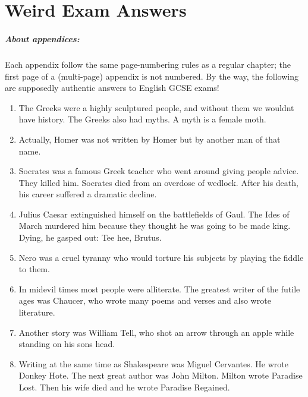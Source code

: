 \chapter{Weird Exam Answers}	%

\paragraph{About appendices:}
	Each appendix follow the same page-numbering rules
	as a regular chapter; the first page of a
	(multi-page) appendix is not numbered.
	By the way, the following are supposedly
	authentic answers to English GCSE exams!


\begin{enumerate}

\item
The Greeks were a highly sculptured people, and without
them we wouldnt have history. The Greeks also had myths.
A myth is a female moth.

\item
Actually, Homer was not written by Homer but by another
man of that name.

\item
Socrates was a famous Greek teacher who went around
giving people advice. They killed him. Socrates died from an
overdose of wedlock. After his death, his career suffered a
dramatic decline.

\item
Julius Caesar extinguished himself on the battlefields
of Gaul. The Ides of March murdered him because they thought
he was going to be made king. Dying, he gasped out: Tee hee,
Brutus.

\item
Nero was a cruel tyranny who would torture his subjects
by playing the fiddle to them.

\item
In midevil times most people were alliterate. The
greatest writer of the futile ages was Chaucer, who
wrote many poems and verses and also wrote literature.

\item
Another story was William Tell, who shot an arrow
through an apple while standing on his sons head.

\item
Writing at the same time as Shakespeare was Miguel
Cervantes. He wrote Donkey Hote. The next great author
was John Milton. Milton wrote Paradise Lost. Then his
wife died and he wrote Paradise Regained.


\end{enumerate}
